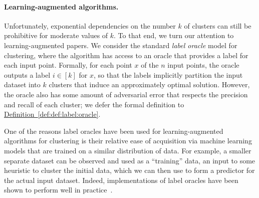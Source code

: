 \documentclass[10pt,a4paper]{amsart}
\newcommand{\namedref}[2]{\hyperref[#2]{#1~\ref*{#2}}}
\newcommand{\defref}[1]{\namedref{Definition}{def:#1}}
\begin{document}
\paragraph{Learning-augmented algorithms.}
Unfortunately, exponential dependencies on the number $k$ of clusters can still be prohibitive for moderate values of $k$. 
To that end, we turn our attention to learning-augmented papers. 
We consider the standard \emph{label oracle} model for clustering, where the algorithm has access to an oracle that provides a label for each input point. 
Formally, for each point $x$ of the $n$ input points, the oracle outputs a label $i\in[k]$ for $x$, so that the labels implicitly partition the input dataset into $k$ clusters that induce an approximately optimal solution. 
However, the oracle also has some amount of adversarial error that respects the precision and recall of each cluster; we defer the formal definition to \defref{def:label:oracle}. 

One of the reasons label oracles have been used for learning-augmented algorithms for clustering is their relative ease of acquisition via machine learning models that are trained on a similar distribution of data. 
For example, a smaller separate dataset can be observed and used as a ``training'' data, an input to some heuristic to cluster the initial data, which we can then use to form a predictor for the actual input dataset. 
Indeed, implementations of label oracles have been shown to perform well in practice~\cite{ErgunFSWZ22,NguyenCN23}.
\end{document}
